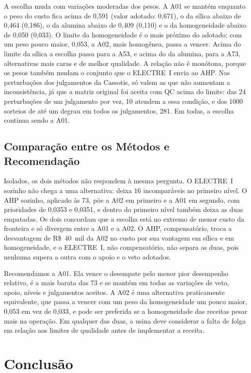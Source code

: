 \documentclass[conference]{IEEEtran}
\begin{document}
A escolha muda com variações moderadas dos pesos. A A01 se mantém enquanto o peso do custo fica acima de 0{,}591 (valor adotado: 0{,}671), o da sílica abaixo de 0{,}464 (0{,}186), o da alumina abaixo de 0{,}409 (0{,}110) e o da homogeneidade abaixo de 0{,}050 (0{,}033). O limite da homogeneidade é o mais próximo do adotado: com um peso pouco maior, 0{,}053, a A02, mais homogênea, passa a vencer. Acima do limite da sílica a escolha passa para a A53, e acima do da alumina, para a A73, alternativas mais caras e de melhor qualidade. A relação não é monótona, porque os pesos também mudam o conjunto que o ELECTRE~I envia ao AHP. Nas perturbações dos julgamentos da Cassotis, só valem as que não aumentam a inconsistência, já que a matriz original foi aceita com QC acima do limite: das 24 perturbações de um julgamento por vez, 10 atendem a essa condição, e dos 1000 sorteios de até um degrau em todos os julgamentos, 281. Em todas, a escolha continua sendo a A01.

\subsection{Comparação entre os Métodos e Recomendação}\label{sec:recomendacao}

Isolados, os dois métodos não respondem à mesma pergunta. O ELECTRE~I sozinho não chega a uma alternativa: deixa 16 incomparáveis no primeiro nível. O AHP sozinho, aplicado às 73, põe a A02 em primeiro e a A01 em segundo, com prioridades de 0{,}0353 e 0{,}0351, e dentro do primeiro nível também deixa as duas empatadas. Os dois concordam que a escolha está no extremo de menor custo da fronteira e só divergem entre a A01 e a A02. O AHP, compensatório, troca a desvantagem de R\$~40~mil da A02 no custo por sua vantagem em sílica e em homogeneidade, e o ELECTRE~I, não compensatório, não separa as duas, pois nenhuma supera a outra com o apoio e o veto adotados.

Recomendamos a A01. Ela vence o desempate pelo menor pior desempenho relativo, é a mais barata das 73 e se mantém em todas as variações de veto, apoio, níveis e julgamentos aceitos. A A02 é uma alternativa praticamente equivalente, que passa a vencer com um peso da homogeneidade um pouco maior, 0{,}053 em vez de 0{,}033, e pode ser preferida se a homogeneidade das receitas pesar mais na operação. Em qualquer das duas, a usina deve considerar a falta de folga em relação aos limites de qualidade antes de implementar a receita.

\section{Conclusão}\label{sec:conclusao}
\end{document}
